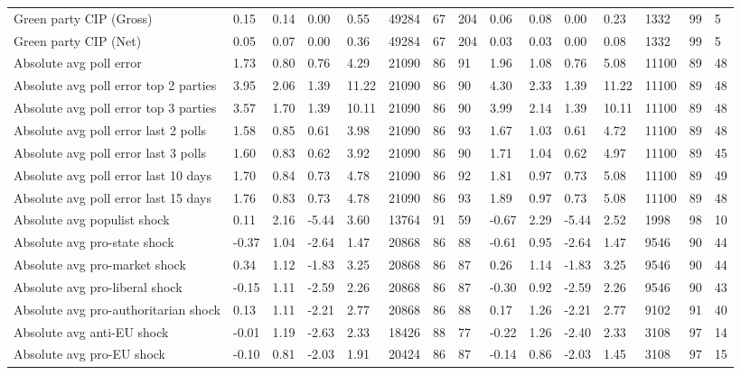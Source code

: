 \begin{longtable}{lllllllllllllll}
\addlinespace
Green party CIP (Gross) & 0.15 & 0.14 & 0.00 & 0.55 & 49284 & 67 & 204 & 0.06 & 0.08 & 0.00 & 0.23 & 1332 & 99 & 5\\
Green party CIP (Net) & 0.05 & 0.07 & 0.00 & 0.36 & 49284 & 67 & 204 & 0.03 & 0.03 & 0.00 & 0.08 & 1332 & 99 & 5\\
Absolute avg poll error & 1.73 & 0.80 & 0.76 & 4.29 & 21090 & 86 & 91 & 1.96 & 1.08 & 0.76 & 5.08 & 11100 & 89 & 48\\
Absolute avg poll error top 2 parties & 3.95 & 2.06 & 1.39 & 11.22 & 21090 & 86 & 90 & 4.30 & 2.33 & 1.39 & 11.22 & 11100 & 89 & 48\\
Absolute avg poll error top 3 parties & 3.57 & 1.70 & 1.39 & 10.11 & 21090 & 86 & 90 & 3.99 & 2.14 & 1.39 & 10.11 & 11100 & 89 & 48\\
\addlinespace
Absolute avg poll error last 2 polls & 1.58 & 0.85 & 0.61 & 3.98 & 21090 & 86 & 93 & 1.67 & 1.03 & 0.61 & 4.72 & 11100 & 89 & 48\\
Absolute avg poll error last 3 polls & 1.60 & 0.83 & 0.62 & 3.92 & 21090 & 86 & 90 & 1.71 & 1.04 & 0.62 & 4.97 & 11100 & 89 & 45\\
Absolute avg poll error last 10 days & 1.70 & 0.84 & 0.73 & 4.78 & 21090 & 86 & 92 & 1.81 & 0.97 & 0.73 & 5.08 & 11100 & 89 & 49\\
Absolute avg poll error last 15 days & 1.76 & 0.83 & 0.73 & 4.78 & 21090 & 86 & 93 & 1.89 & 0.97 & 0.73 & 5.08 & 11100 & 89 & 48\\
Absolute avg populist shock & 0.11 & 2.16 & -5.44 & 3.60 & 13764 & 91 & 59 & -0.67 & 2.29 & -5.44 & 2.52 & 1998 & 98 & 10\\
\addlinespace
Absolute avg pro-state shock & -0.37 & 1.04 & -2.64 & 1.47 & 20868 & 86 & 88 & -0.61 & 0.95 & -2.64 & 1.47 & 9546 & 90 & 44\\
Absolute avg pro-market shock & 0.34 & 1.12 & -1.83 & 3.25 & 20868 & 86 & 87 & 0.26 & 1.14 & -1.83 & 3.25 & 9546 & 90 & 44\\
Absolute avg pro-liberal shock & -0.15 & 1.11 & -2.59 & 2.26 & 20868 & 86 & 87 & -0.30 & 0.92 & -2.59 & 2.26 & 9546 & 90 & 43\\
Absolute avg pro-authoritarian shock & 0.13 & 1.11 & -2.21 & 2.77 & 20868 & 86 & 88 & 0.17 & 1.26 & -2.21 & 2.77 & 9102 & 91 & 40\\
Absolute avg anti-EU shock & -0.01 & 1.19 & -2.63 & 2.33 & 18426 & 88 & 77 & -0.22 & 1.26 & -2.40 & 2.33 & 3108 & 97 & 14\\
\addlinespace
Absolute avg pro-EU shock & -0.10 & 0.81 & -2.03 & 1.91 & 20424 & 86 & 87 & -0.14 & 0.86 & -2.03 & 1.45 & 3108 & 97 & 15\\

\end{longtable}
